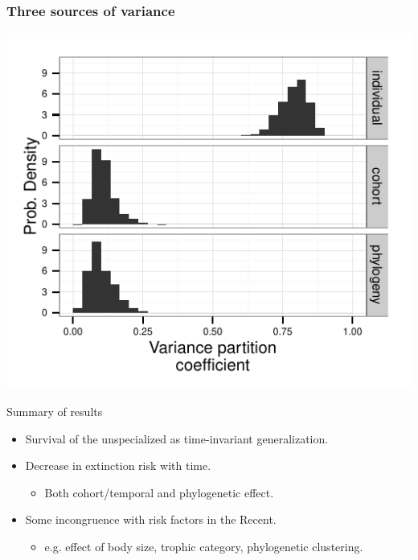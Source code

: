 \documentclass{beamer}
\begin{document}
\begin{frame}
  \frametitle{Three sources of variance}

  \begin{center}
    \includegraphics[height=0.8\textheight,keepaspectratio=true]{figure/variance_est}
  \end{center}

  \tiny{}
\end{frame}

\begin{frame}
  \begin{block}{Summary of results}
    \begin{itemize}
      \item Survival of the unspecialized as time-invariant generalization.
      \item Decrease in extinction risk with time.
        \begin{itemize}
          \item Both cohort/temporal and phylogenetic effect.
        \end{itemize}
      \item Some incongruence with risk factors in the Recent.
        \begin{itemize}
          \item e.g. effect of body size, trophic category, phylogenetic clustering.
        \end{itemize}
    \end{itemize}
  \end{block}
\end{frame}
\end{document}
